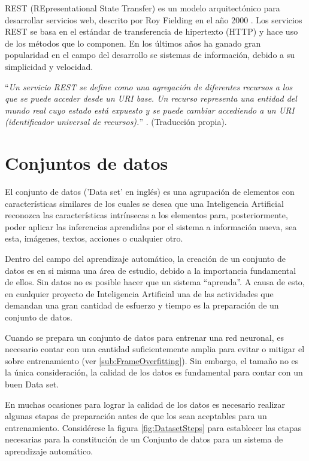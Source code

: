        REST (REpresentational State Transfer) es un modelo arquitectónico para desarrollar servicios web, descrito por Roy Fielding en el año 2000 \cite{Fielding2000}. Los servicios REST se basa en el estándar de transferencia de hipertexto (HTTP) y hace uso de los métodos que lo componen. En los últimos años ha ganado gran popularidad en el campo del desarrollo se sistemas de información, debido a su simplicidad y velocidad.
        
        ``\textit{Un servicio REST se define como una agregación de diferentes recursos a los que se puede acceder desde un URI base. Un recurso representa una entidad del mundo real cuyo estado está expuesto y se puede cambiar accediendo a un URI (identificador universal de recursos).}'' \cite{Pautasso2008}. (Traducción propia).
        
\section{Conjuntos de datos}
\label{Sec:FrameDataset}
    
    El conjunto de datos ('Data set' en inglés) es una agrupación de elementos con características similares de los cuales se desea que una Inteligencia Artificial reconozca las características intrínsecas a los elementos para, posteriormente, poder aplicar las inferencias aprendidas por el sistema a información nueva, sea esta, imágenes, textos, acciones o cualquier otro.
    
    Dentro del campo del aprendizaje automático, la creación de un conjunto de datos es en si misma una área de estudio, debido a la importancia fundamental de ellos. Sin datos no es posible hacer que un sistema ``aprenda''. A causa de esto, en cualquier proyecto de Inteligencia Artificial una de las actividades que demandan una gran cantidad de esfuerzo y tiempo es la preparación de un conjunto de datos.
    
    Cuando se prepara un conjunto de datos para entrenar una red neuronal, es necesario contar con una cantidad suficientemente amplia para evitar o mitigar el sobre entrenamiento (ver \ref{sub:FrameOverfitting}). Sin embargo, el tamaño no es la única consideración, la calidad de los datos es fundamental para contar con un buen Data set. 
    
    En muchas ocasiones para lograr la calidad de los datos es necesario realizar algunas etapas de preparación antes de que los sean aceptables para un entrenamiento. Considérese la figura \ref{fig:DatasetSteps} para establecer las etapas necesarias para la constitución de un Conjunto de datos para un sistema de aprendizaje automático.

